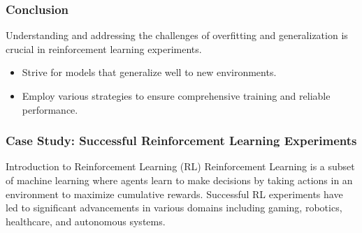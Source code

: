 \documentclass[aspectratio=169]{beamer}
\begin{document}
\begin{frame}[fragile]
    \frametitle{Conclusion}
    Understanding and addressing the challenges of overfitting and generalization is crucial in reinforcement learning experiments. 
    \begin{itemize}
        \item Strive for models that generalize well to new environments.
        \item Employ various strategies to ensure comprehensive training and reliable performance.
    \end{itemize}
\end{frame}

\begin{frame}[fragile]
    \frametitle{Case Study: Successful Reinforcement Learning Experiments}
    \begin{block}{Introduction to Reinforcement Learning (RL)}
        Reinforcement Learning is a subset of machine learning where agents learn to make decisions by taking actions in an environment to maximize cumulative rewards. Successful RL experiments have led to significant advancements in various domains including gaming, robotics, healthcare, and autonomous systems.
    \end{block}
\end{frame}
\end{document}
